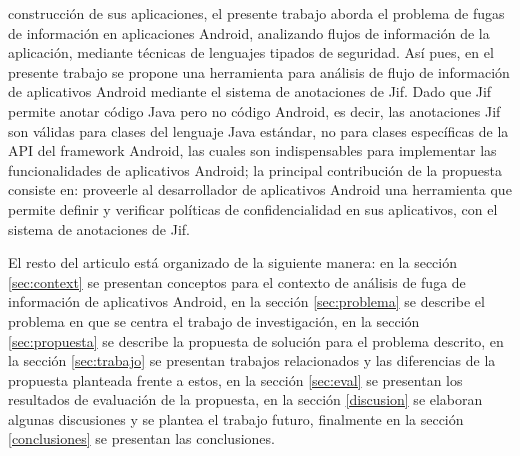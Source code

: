 construcción de sus aplicaciones, el presente trabajo aborda el problema de
fugas de información en aplicaciones Android, analizando flujos de información
de la aplicación, mediante técnicas de lenguajes tipados de seguridad.\newline
Así pues, en el presente trabajo se propone una herramienta para análisis de
flujo de información de aplicativos Android mediante el sistema de anotaciones
de Jif.\newline
Dado que Jif permite
anotar código Java pero no código Android, es decir, las anotaciones Jif son
válidas para clases del lenguaje Java estándar, no para clases específicas de la
API del framework Android, las cuales son indispensables para
implementar las funcionalidades de aplicativos Android; la principal
contribución de la propuesta consiste en: proveerle al desarrollador de
aplicativos Android una herramienta que permite definir y verificar políticas de
confidencialidad en sus aplicativos, con el sistema de anotaciones de
Jif.\newline

El resto del articulo está organizado de la siguiente manera: en la sección
\ref{sec:context} se presentan conceptos para el contexto de análisis
de fuga de información de aplicativos Android, en la sección \ref{sec:problema}
se describe el problema en que se centra el trabajo de investigación, en la sección
\ref{sec:propuesta} se describe la propuesta de solución para el problema
descrito, en la sección \ref{sec:trabajo} se presentan trabajos relacionados y
las diferencias de la propuesta planteada frente a estos, en la sección
\ref{sec:eval} se presentan los resultados de evaluación de la propuesta, en la
sección \ref{discusion} se elaboran algunas discusiones y se plantea el trabajo
futuro, finalmente en la sección \ref{conclusiones} se presentan las
conclusiones.

